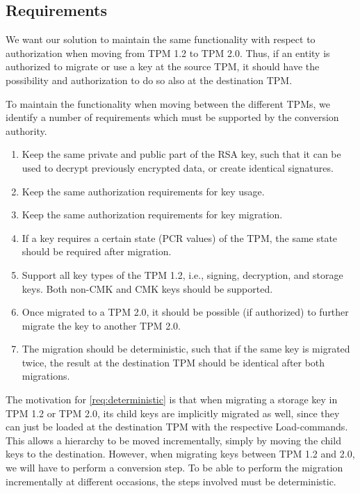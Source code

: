 {\subsection{Requirements}
We want our solution to maintain the same functionality with respect to authorization when moving from TPM 1.2 to TPM 2.0. Thus, if an entity is authorized to migrate or use a key at the source TPM, it should have the possibility and authorization to do so also at the destination TPM.

To maintain the functionality when moving between the different TPMs, we identify a number of requirements which must be supported by the conversion authority.

\begin{enumerate}[label=R\arabic*.,ref=R\arabic*]
	\item Keep the same private and public part of the RSA key, such that it can be used to decrypt previously encrypted data, or create identical signatures. \label{req:privpub}
	\item Keep the same authorization requirements for key usage.\label{req:usageath}
	\item Keep the same authorization requirements for key migration. \label{req:migrationauth}
	\item If a key requires a certain state (PCR values) of the TPM, the same state should be required after migration. \label{req:pcr}
	\item Support all key types of the TPM 1.2, i.e., signing, decryption, and storage keys. Both non-CMK and CMK keys should be supported. \label{req:keytypes}
	\item Once migrated to a TPM 2.0, it should be possible (if authorized) to further migrate the key to another TPM 2.0. \label{req:furthermigration}
	\item The migration should be deterministic, such that if the same key is migrated twice, the result at the destination TPM should be identical after both migrations. \label{req:deterministic}
\end{enumerate}

The motivation for \ref{req:deterministic} is that when migrating a storage key in TPM 1.2 or TPM 2.0, its child keys are implicitly migrated as well, since they can just be loaded at the destination TPM with the respective Load-commands. This allows a hierarchy to be moved incrementally, simply by moving the child keys to the destination. However, when migrating keys between TPM 1.2 and 2.0, we will have to perform a conversion step. To be able to perform the migration incrementally at different occasions, the steps involved must be deterministic.

}
